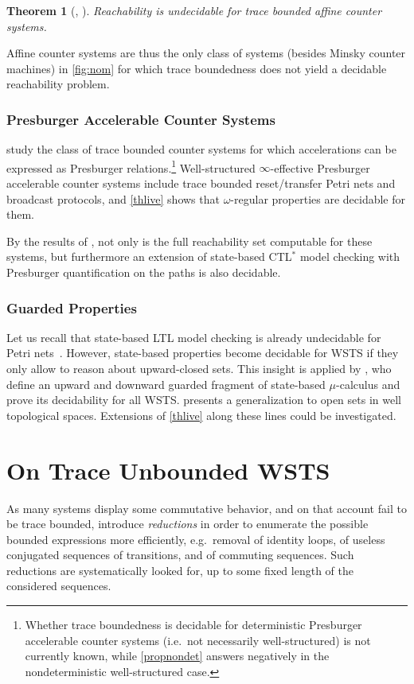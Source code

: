 \documentclass[11pt,reqno,a4paper]{amsart}
\newcommand{\citeay}[1]{\citeauthor{#1}, \citeyear{#1}}
\theoremstyle{plain}
\newtheorem{theorem}{Theorem}
\theoremstyle{definition}
\theoremstyle{remark}
\renewcommand{\paragraph}{\subsubsection*}
\begin{document}
\begin{theorem}[\citeay{racs}]Reachability is undecidable for trace bounded affine counter systems.
\end{theorem}
Affine counter systems are thus the only class of systems
(besides Minsky counter machines) in \autoref{fig:nom} for which trace boundedness
does not yield a decidable reachability problem.


\paragraph{Presburger Accelerable Counter Systems}
 study the class of trace bounded counter systems for which
accelerations can be expressed as Presburger relations.\footnote{Whether
  trace boundedness is decidable for deterministic Presburger
  accelerable counter systems (i.e.\ not necessarily well-structured) is
  not currently known, while \autoref{propnondet} answers
  negatively in the nondeterministic well-structured case.}
Well-structured $\infty$-effective Presburger accelerable counter
systems include trace bounded reset/transfer Petri nets and broadcast
protocols, and \autoref{thlive} shows that $\omega$-regular
properties are decidable for them.

By the results of \citeauthor{foctlpr}, not only is the full
reachability set computable for these systems, but furthermore an
extension of state-based CTL$^\ast$ model checking with Presburger
quantification on the paths is also decidable.

\paragraph{Guarded Properties}
Let us recall that state-based LTL model checking is already undecidable
for Petri nets~\citep{ltlpn}.  However, state-based properties become
decidable for WSTS if they only allow to reason about upward-closed
sets.  This insight is applied by \citet{lpar06}, who define an upward and
downward guarded fragment of state-based $\mu$-calculus and prove its
decidability for all WSTS.   presents a generalization to
open sets in well topological spaces.  Extensions of
\autoref{thlive} along these lines could be investigated.

\section{On Trace Unbounded WSTS}\label{sec:tunb}
As many systems display some commutative behavior, and on
that account fail to be trace bounded, \citet[Section~5.2]{flataccel}
introduce \emph{reductions} in order to enumerate the possible 
bounded expressions more efficiently, e.g.\ removal of identity loops, of
useless conjugated sequences of transitions, and of commuting
sequences.  Such reductions are systematically looked for, up to some
fixed length of the considered sequences.
\end{document}
